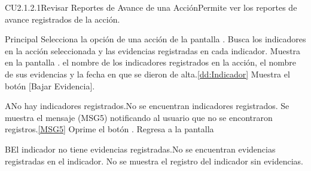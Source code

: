 
	\begin{UseCase}{CU2.1.2.1}{Revisar Reportes de Avance de una Acción}{Permite ver los reportes de avance registrados de la acción.}
	\end{UseCase}
	
	
	\begin{UCtrayectoria}{Principal}
		\UCpaso[\UCactor] Selecciona la opción  de una acción de la pantalla .
		\UCpaso Busca los indicadores en la acción seleccionada y las evidencias registradas en cada indicador.
		\UCpaso Muestra en la pantalla . el nombre de los indicadores registrados en la acción, el nombre de sus evidencias y la fecha en que se dieron de alta.\ref{dd:Indicador}
		\UCpaso Muestra el botón [Bajar Evidencia].  
		
	\end{UCtrayectoria}
	
		\begin{UCtrayectoriaA}{A}{No hay indicadores registrados.}{No se encuentran indicadores registrados.}
			\UCpaso Se muestra el mensaje (MSG5) notificando al usuario que no se encontraron registros.\ref{MSG5}
			\UCpaso[\UCactor] Oprime el botón .
			\UCpaso Regresa a la pantalla 
		\end{UCtrayectoriaA}
    
    \begin{UCtrayectoriaA}{B}{El indicador no tiene evidencias registradas.}{No se encuentran evidencias registradas en el indicador.}
      \UCpaso No se muestra el registro del indicador sin evidencias.
    \end{UCtrayectoriaA}
